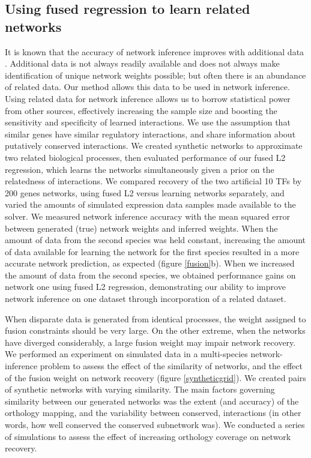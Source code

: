 \documentclass[11pt]{article}
\begin{document}
\subsection{Using fused regression to learn related networks}
It is known that the accuracy of network inference improves with additional data \cite{bar-joseph_computational_2003}. Additional data is not always readily available and does not always make identification of unique network weights possible; but often there is an abundance of related data. Our method allows this data to be used in network inference. Using related data for network inference allows us to borrow statistical power from other sources, effectively increasing the sample size and boosting the sensitivity and specificity of learned interactions. We use the assumption that similar genes have similar regulatory interactions, and share information about putatively conserved interactions. We created synthetic networks to approximate two related biological processes, then evaluated performance of our fused L2 regression, which learns the networks simultaneously given a prior on the relatedness of interactions. We compared recovery of the two artificial 10 TFs by 200 genes networks, using fused L2 versus learning networks separately, and varied the amounts of simulated expression data samples made available to the solver. We measured network inference accuracy with the mean squared error between generated (true) network weights and inferred weights. When the amount of data from the second species was held constant, increasing the amount of data available for learning the network for the first species resulted in a more accurate network prediction, as expected  (figure \ref{fusion}b). When we increased the amount of data from the second species, we obtained performance gains on network one using fused L2 regression, demonstrating our ability to improve network inference on one dataset through incorporation of a related dataset.

When disparate data is generated from identical processes, the weight assigned to fusion constraints should be very large. On the other extreme, when the networks have diverged considerably, a large fusion weight may impair network recovery. We performed an experiment on simulated data in a multi-species network-inference problem to assess the effect of the similarity of networks, and the effect of the fusion weight on network recovery (figure \ref{syntheticgrid}). We created pairs of synthetic networks with varying similarity. The main factors governing similarity between our generated networks was the extent (and accuracy) of the orthology mapping, and the variability between conserved, interactions (in other words, how well conserved the conserved subnetwork was). We conducted a series of simulations to assess the effect of increasing orthology coverage on network recovery.
\end{document}
